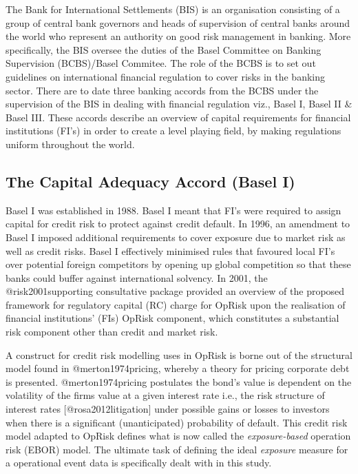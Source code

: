 \documentclass[
]{article}
\begin{document}
The Bank for International Settlements (BIS) is an organisation
consisting of a group of central bank governors and heads of supervision
of central banks around the world who represent an authority on good
risk management in banking. More specifically, the BIS oversee the
duties of the Basel Committee on Banking Supervision (BCBS)/Basel
Commitee. The role of the BCBS is to set out guidelines on international
financial regulation to cover risks in the banking sector. There are to
date three banking accords from the BCBS under the supervision of the
BIS in dealing with financial regulation viz., Basel I, Basel II \&
Basel III. These accords describe an overview of capital requirements
for financial institutions (FI's) in order to create a level playing
field, by making regulations uniform throughout the world.

\subsection{The Capital Adequacy Accord (Basel I)}

Basel I was established in 1988. Basel I meant that FI's were required
to assign capital for credit risk to protect against credit default. In
1996, an amendment to Basel I imposed additional requirements to cover
exposure due to market risk as well as credit risks. Basel I effectively
minimised rules that favoured local FI's over potential foreign
competitors by opening up global competition so that these banks could
buffer against international solvency. In 2001, the @risk2001supporting
consultative package provided an overview of the proposed framework for
regulatory capital (RC) charge for OpRisk upon the realisation of
financial institutions' (FIs) OpRisk component, which constitutes a
substantial risk component other than credit and market risk. \medskip

A construct for credit risk modelling uses in OpRisk is borne out of the
structural model found in @merton1974pricing, whereby a theory for
pricing corporate debt is presented. @merton1974pricing postulates the
bond's value is dependent on the volatility of the firms value at a
given interest rate i.e., the risk structure of interest rates
{[}@rosa2012litigation{]} under possible gains or losses to investors
when there is a significant (unanticipated) probability of default. This
credit risk model adapted to OpRisk defines what is now called the
\emph{exposure-based} operation risk (EBOR) model. The ultimate task of
defining the ideal \emph{exposure} measure for a operational event data
is specifically dealt with in this study.\medskip
\end{document}

